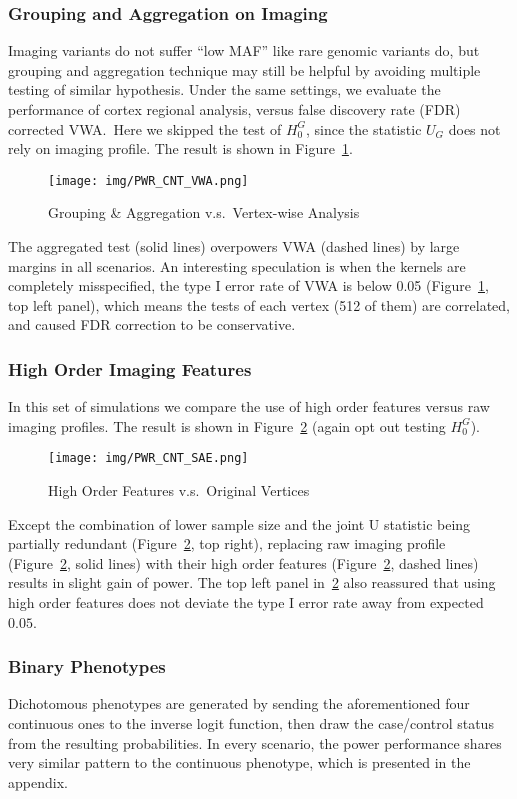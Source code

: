 \subsubsection{Grouping and Aggregation on Imaging}
Imaging variants do not suffer ``low MAF'' like rare genomic variants do, but grouping and aggregation technique may still be helpful by avoiding multiple testing of similar hypothesis. Under the same settings, we evaluate the performance of cortex regional analysis, versus false discovery rate (FDR) corrected VWA.\ Here we skipped the test of $H_0^G$, since the statistic $U_G$ does not rely on imaging profile. The result is shown in Figure~\ref{fig:PWR_CNT_VWA}.
\begin{figure}[!htbp]
  \centering
  \texttt{[image: img/PWR\_CNT\_VWA.png]}
  \caption{Grouping \& Aggregation v.s.\ Vertex-wise Analysis}\label{fig:PWR_CNT_VWA}
\end{figure}
The aggregated test (solid lines) overpowers VWA (dashed lines) by large margins in all scenarios. An interesting speculation is when the kernels are completely misspecified, the type I error rate of VWA is below 0.05 (Figure~\ref{fig:PWR_CNT_VWA}, top left panel), which means the tests of each vertex (512 of them) are correlated, and caused FDR correction to be conservative. 

\subsubsection{High Order Imaging Features}
In this set of simulations we compare the use of high order features versus raw imaging profiles. The result is shown in Figure~\ref{fig:PWR_CNT_SAE} (again opt out testing $H_0^G$).
\begin{figure}[!htbp]
  \centering
  \texttt{[image: img/PWR\_CNT\_SAE.png]}
  \caption{High Order Features v.s.\ Original Vertices}\label{fig:PWR_CNT_SAE}
\end{figure}
Except the combination of lower sample size and the joint U statistic being partially redundant (Figure~\ref{fig:PWR_CNT_SAE}, top right), replacing raw imaging profile (Figure~\ref{fig:PWR_CNT_SAE}, solid lines) with their high order features (Figure~\ref{fig:PWR_CNT_SAE}, dashed lines) results in slight gain of power. The top left panel in~\ref{fig:PWR_CNT_SAE} also reassured that using high order features does not deviate the type I error rate away from expected $0.05$.

\subsubsection{Binary Phenotypes}
Dichotomous phenotypes are generated by sending the aforementioned four continuous ones to the inverse logit function, then draw the case/control status from the resulting probabilities. In every scenario, the power performance shares very similar pattern to the continuous phenotype, which is presented in the appendix.

